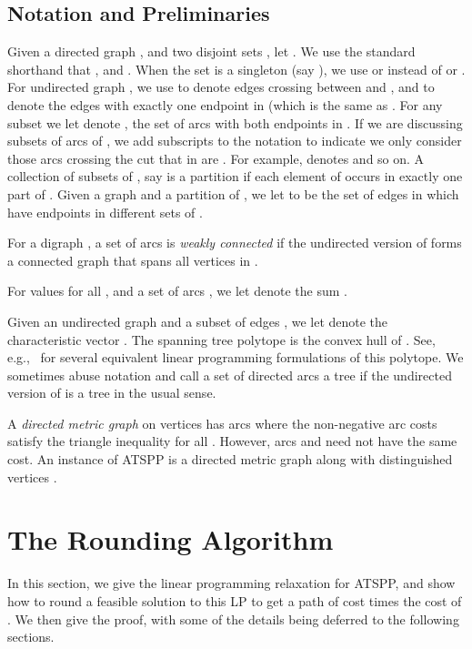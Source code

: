 \documentclass[11pt]{article}
\theoremstyle{definition}
\newcounter{note}[section]
\begin{document}
\subsection{Notation and Preliminaries}

Given a directed graph , and two disjoint sets , let . We use the
standard shorthand that ,
and . When the set  is a
singleton (say ), we use  or 
instead of  or . For undirected
graph , we use  to denote edges crossing
between  and , and  to denote the edges with exactly
one endpoint in  (which is the same as .
For any subset  we let  denote , the set of
arcs with both endpoints in .
If we are discussing subsets of arcs  of , we add subscripts
to the  notation to indicate we only consider those arcs crossing
the cut that in are .
For example,  denotes 
and so on. A collection of subsets of , say  is a partition if each element of  occurs in exactly one part of . Given a graph  and a partition
 of , we let  to be the set of edges in  which have endpoints in different sets of .

For a digraph , a set of arcs  is \emph{weakly
  connected} if the undirected version of  forms a connected graph
that spans all vertices in .

For values  for all , and a set of arcs , we let  denote the sum .

Given an undirected graph  and a subset of edges
, we let  denote
the characteristic vector . The spanning
tree polytope is the convex hull of . See, e.g.,~\cite[Chapter~50]{Schrijver-book} for
several equivalent linear programming formulations of this polytope.
We sometimes abuse notation and call a set of directed arcs 
a tree if the undirected version of  is a tree in the usual sense.


A \emph{directed metric graph} on vertices  has arcs 
where the non-negative arc costs satisfy the triangle
inequality  for all . However,
arcs  and  need not have the same cost. An instance of ATSPP
is a directed metric graph along with distinguished vertices .



\section{The Rounding Algorithm}
\label{sec:rounding-algorithm}


In this section, we give the linear programming relaxation for
ATSPP, and show how to round a feasible solution  to this LP to get a path of
cost  times the cost of .
We then give the proof, with some of the details being deferred to the
following sections.
\end{document}

